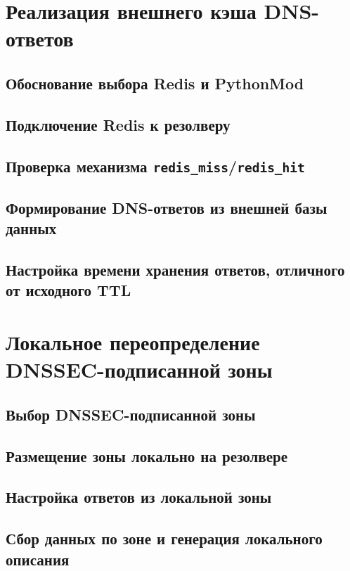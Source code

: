 \documentclass[a4paper,14pt]{extarticle}
\begin{document}
\section{Реализация внешнего кэша DNS-ответов}

\subsection{Обоснование выбора Redis и PythonMod}

\subsection{Подключение Redis к резолверу}

\subsection{Проверка механизма \texttt{redis\_miss}/\texttt{redis\_hit}}

\subsection{Формирование DNS-ответов из внешней базы данных}

\subsection{Настройка времени хранения ответов, отличного от исходного TTL}

\section{Локальное переопределение DNSSEC-подписанной зоны}

\subsection{Выбор DNSSEC-подписанной зоны}

\subsection{Размещение зоны локально на резолвере}

\subsection{Настройка ответов из локальной зоны}

\subsection{Сбор данных по зоне и генерация локального описания}
\end{document}
